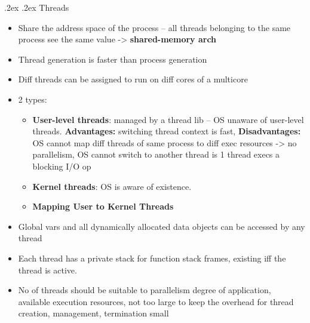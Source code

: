 \documentclass[10pt,landscape,a4paper]{article}
\makeatletter
\renewcommand{\subsubsection}{\@startsection{subsubsection}{1}{0mm}%
  {.2ex}%
  {.2ex}%
{\rmfamily\bfseries}}
\makeatother
\begin{document}
\begin{multicols*}{4}
  \subsubsection{Threads}
  \begin{itemize}
    \item Share the address space of the process -- all threads belonging to the same process see the same value -> \textbf{shared-memory arch}
    \item Thread generation is faster than process generation
    \item Diff threads can be assigned to run on diff cores of a multicore
    \item 2 types:
    \begin{itemize}
      \item \textbf{User-level threads}: managed by a thread lib -- OS unaware of user-level threads. \textbf{Advantages:} switching thread context is fast, \textbf{Disadvantages:} OS cannot map diff threads of same process to diff exec resources -> no parallelism, OS cannot switch to another thread is 1 thread execs a blocking I/O op
      \item \textbf{Kernel threads}: OS is aware of existence.
      \item \textbf{Mapping User to Kernel Threads}
    \end{itemize}
    \item Global vars and all dynamically allocated data objects can be accessed by any thread
    \item Each thread has a private stack for function stack frames, existing iff the thread is active.
    \item No of threads should be suitable to parallelism degree of application, available execution resources, not too large to keep the overhead for thread creation, management, termination small
  \end{itemize}

\end{multicols*}
\end{document}
